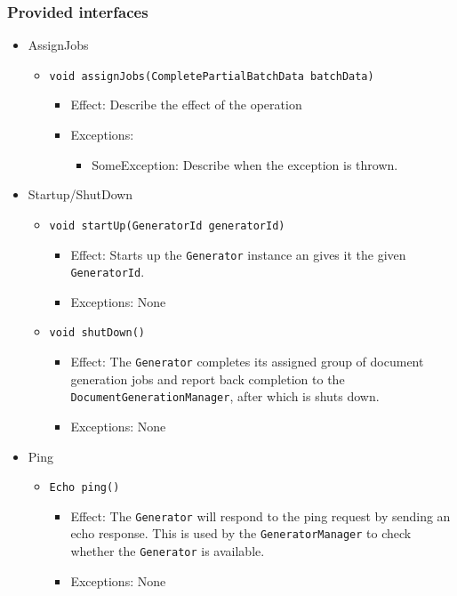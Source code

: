 \documentclass[a4paper,10pt]{article}
\begin{document}
\subsubsection*{Provided interfaces}
\begin{itemize}
    \item AssignJobs
    \begin{itemize}
        \item \texttt{void assignJobs(CompletePartialBatchData batchData)}
        \begin{itemize}
            \item Effect: Describe the effect of the operation
            \item Exceptions:
            \begin{itemize}
                \item SomeException: Describe when the exception is thrown.
            \end{itemize}
        \end{itemize}
    \end{itemize}

    \item Startup/ShutDown
    \begin{itemize}
        \item \texttt{void startUp(GeneratorId generatorId)}
        \begin{itemize}
            \item Effect: Starts up the \texttt{Generator} instance an gives it the given \texttt{GeneratorId}. 
            \item Exceptions: None
        \end{itemize}
        
          \item \texttt{void shutDown()}
        \begin{itemize}
            \item Effect: The \texttt{Generator} completes its assigned group of document generation jobs and report back completion to the \texttt{DocumentGenerationManager}, after which is shuts down.
            \item Exceptions: None
        \end{itemize}
    \end{itemize}
    
    \item Ping
    \begin{itemize}
        \item \texttt{Echo ping()}
        \begin{itemize}
            \item Effect: The \texttt{Generator} will respond to the ping request by sending an echo response. This is used by the \texttt{GeneratorManager} to check whether the \texttt{Generator} is available.
            \item Exceptions: None
        \end{itemize}
    \end{itemize}
\end{itemize}
\end{document}
